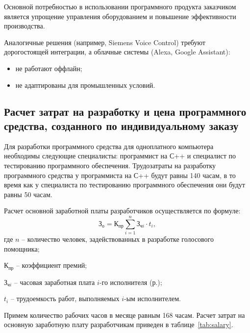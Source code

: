 Основной потребностью в использовании программного продукта заказчиком является упрощение управления оборудованием и повышение эффективности производства. 

Аналогичные решения (например, Siemens Voice Control) требуют дорогостоящей интеграции, а облачные системы (Alexa, Google Assistant):
\begin{itemize}
	\item не работают оффлайн;
	\item не адаптированы для промышленных условий.
\end{itemize}


\subsection{Расчет затрат на разработку и цена программного средства, созданного по индивидуальному заказу} 
\label{subsec:dev_cost_calculation}

Для разработки программного средства для одноплатного компьютера необходимы следующие специалисты: программист на С++ и специалист по тестированию программного обеспечения. Трудозатраты на разработку программного средства у программиста на С++ будут равны 140 часам, в то время как у специалиста по тестированию программного обеспечения они будут равны 50 часам.

Расчет основной заработной платы разработчиков осуществляется по формуле:
\begin{equation}
	\label{eq:base_salary}
	\mathrm{З_{о}} =  \mathrm{К_{пр}} \sum_{i=1}^n \text{З}_{\text{ч}i} \cdot t_i,
\end{equation}
где $n$ -- количество человек, задействованных в разработке голосового помощника; 

\hspace{-0.4em}$\mathrm{К_{пр}}$ -- коэффициент премий; 

\hspace{-0.4em}$\text{З}_{\text{ч}i}$ -- часовая заработная плата $i$-го исполнителя (р.); 

\hspace{-0.4em}$t_i$ -- трудоемкость работ, выполняемых $i$-ым исполнителем.

Примем количество рабочих часов в месяце равным 168 часам. Расчет затрат на основную заработную плату разработчикам приведен в таблице~\ref{tab:salary}. 


